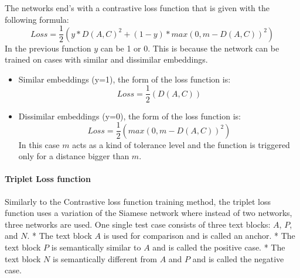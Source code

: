 \documentclass{wseas}
\begin{document}
The networks end's with a contrastive loss function that is given with
the following formula:
\begin{equation} 
  Loss =  \frac{1}{2} (y*D(A,C)^2 + (1-y)*max(0,m-D(A,C))^2)
\end{equation}
In the previous function \(y\) can be 1 or 0. This is because the
network can be trained on cases with similar and dissimilar embeddings.

\begin{itemize}

\item
  Similar embeddings (y=1), the form of the loss function is: 
  \begin{equation}
    Loss = \frac{1}{2}(D(A,C))
  \end{equation}

\item
  Dissimilar embeddings (y=0), the form of the loss function is: 
  \begin{equation}
    Loss =  \frac{1}{2}(max(0,m-D(A,C))^2)
  \end{equation}
  In this case \(m\) acts as a kind of tolerance level and the
  function is triggered only for a distance bigger than \(m\).
\end{itemize}


\paragraph{Triplet Loss function}

Similarly to the Contrastive loss function training method, the triplet
loss function uses a variation of the Siamese network where instead of
two networks, three networks are used. One single test case consists of
three text blocks: \(A\), \(P\), and \(N\). * The text block \(A\) is
used for comparison and is called an anchor. * The text block \(P\) is
semantically similar to \(A\) and is called the positive case. * The
text block \(N\) is semantically different from \(A\) and \(P\) and is
called the negative case.


                   
\end{document}
